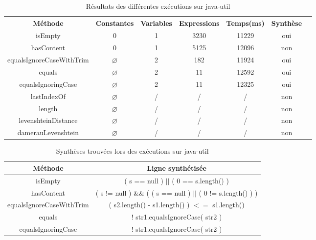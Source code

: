 \begin{table}
\centering
\begin{tabular}{|c|c|c|c|c|c|c|}
\hline
Méthode & Constantes & Variables & Expressions & Temps(ms) & Synthèse \\
\hline
isEmpty & ${ 0 }$ & 1 & 3230 & 11229 & oui \\
\hline
hasContent & ${ 0 }$ & 1 & 5125 & 12096 & non \\
\hline
equalsIgnoreCaseWithTrim & $\varnothing$ & 2 & 182 & 11924 & oui\\
\hline
equals & $\varnothing$ & 2 & 11 & 12592 & oui\\
\hline
equalsIgnoringCase & $\varnothing$ & 2 & 11 & 12325 & oui\\
\hline
lastIndexOf & $\varnothing$ & / & / & / & non \\
\hline
length & $\varnothing$ & / & / & / & non\\
\hline
levenshteinDistance & $\varnothing$ & / & / & / & non\\
\hline
damerauLevenshtein & $\varnothing$ & / & / & / & non\\
\hline
\end{tabular}

\caption{Résultats des différentes exécutions sur java-util}
\label{table:resultats}
\end{table}         

\begin{table}
\centering
\begin{tabular}{|c|c|}
\hline
Méthode & Ligne synthétisée \\
\hline
isEmpty &  ( s == null ) $||$ ( 0 == s.length() ) \\
\hline
hasContent & ( s != null ) \&\& ( ( s == null ) $||$ ( 0 != s.length() ) ) \\
\hline
equalsIgnoreCaseWithTrim & ( s2.length() - s1.length() ) $<=$ s1.length()\\
\hline
equals & ! str1.equalsIgnoreCase( str2 )\\
\hline
equalsIgnoringCase & ! str1.equalsIgnoreCase( str2 )\\
\hline
\end{tabular}
\caption{Synthèses trouvées lors des exécutions sur java-util}
\label{table:patch}
\end{table}


